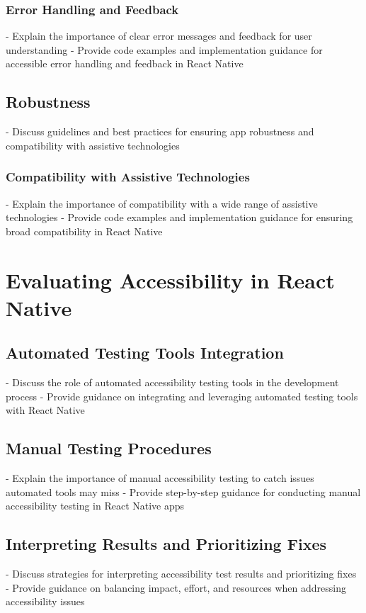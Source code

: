 \subsubsection{Error Handling and Feedback}
- Explain the importance of clear error messages and feedback for user understanding
- Provide code examples and implementation guidance for accessible error handling and feedback in React Native

\subsection{Robustness}
- Discuss guidelines and best practices for ensuring app robustness and compatibility with assistive technologies

\subsubsection{Compatibility with Assistive Technologies}
- Explain the importance of compatibility with a wide range of assistive technologies
- Provide code examples and implementation guidance for ensuring broad compatibility in React Native

\section{Evaluating Accessibility in React Native}
\label{sec:evaluating-accessibility}
\subsection{Automated Testing Tools Integration}
- Discuss the role of automated accessibility testing tools in the development process
- Provide guidance on integrating and leveraging automated testing tools with React Native

\subsection{Manual Testing Procedures}
- Explain the importance of manual accessibility testing to catch issues automated tools may miss
- Provide step-by-step guidance for conducting manual accessibility testing in React Native apps

\subsection{Interpreting Results and Prioritizing Fixes}
- Discuss strategies for interpreting accessibility test results and prioritizing fixes
- Provide guidance on balancing impact, effort, and resources when addressing accessibility issues

